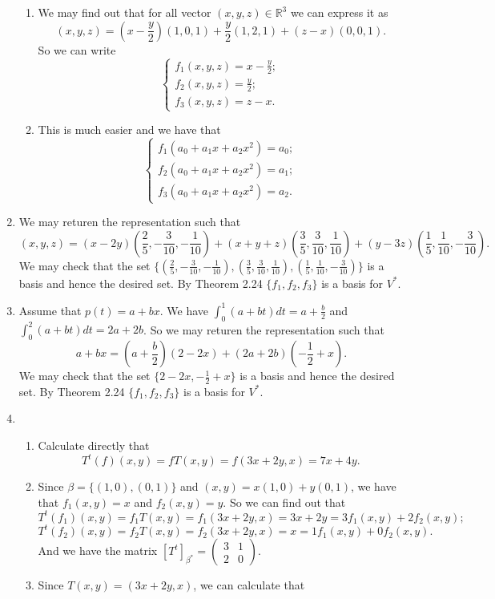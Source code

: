 \begin{enumerate}
\begin{enumerate}
\item We may find out that for all vector $(x,y,z)\in \mathbb{R}^3$ we can express it as 
\[(x,y,z)=(x-\frac{y}{2})(1,0,1)+\frac{y}{2}(1,2,1)+(z-x)(0,0,1).\]
So we can write 
\[\left\{\begin{array}{l}f_1(x,y,z)=x-\frac{y}{2};\\f_2(x,y,z)=\frac{y}{2};\\f_3(x,y,z)=z-x.\end{array}\right.\]
\item This is much easier and we have that 
\[\left\{\begin{array}{l}f_1(a_0+a_1x+a_2x^2)=a_0;\\f_2(a_0+a_1x+a_2x^2)=a_1;\\f_3(a_0+a_1x+a_2x^2)=a_2.\end{array}\right.\]
\end{enumerate}
\item We may returen the representation such that 
\[(x,y,z)=(x-2y)(\frac{2}{5},-\frac{3}{10},-\frac{1}{10})+(x+y+z)(\frac{3}{5},\frac{3}{10},\frac{1}{10})+(y-3z)(\frac{1}{5},\frac{1}{10},-\frac{3}{10}).\]
We may check that the set $\{(\frac{2}{5},-\frac{3}{10},-\frac{1}{10}),(\frac{3}{5},\frac{3}{10},\frac{1}{10}),(\frac{1}{5},\frac{1}{10},-\frac{3}{10})\}$ is a basis and hence the desired set. By Theorem 2.24 $\{f_1,f_2,f_3\}$ is a basis for $V^*$.
\item Assume that $p(t)=a+bx$. We have $\int_0^1{(a+bt)}dt=a+\frac{b}{2}$ and $\int_0^2{(a+bt)}dt=2a+2b$. So we may returen the representation such that 
\[a+bx=(a+\frac{b}{2})(2-2x)+(2a+2b)(-\frac{1}{2}+x).\]
We may check that the set $\{2-2x,-\frac{1}{2}+x\}$ is a basis and hence the desired set. By Theorem 2.24 $\{f_1,f_2,f_3\}$ is a basis for $V^*$.
\item \begin{enumerate}
\item Calculate directly that 
\[T^t(f)(x,y)=fT(x,y)=f(3x+2y,x)=7x+4y.\]
\item Since $\beta=\{(1,0),(0,1)\}$ and $(x,y)=x(1,0)+y(0,1)$, we have that $f_1(x,y)=x$ and $f_2(x,y)=y$. So we can find out that 
\[T^t(f_1)(x,y)=f_1T(x,y)=f_1(3x+2y,x)=3x+2y=3f_1(x,y)+2f_2(x,y);\]
\[T^t(f_2)(x,y)=f_2T(x,y)=f_2(3x+2y,x)=x=1f_1(x,y)+0f_2(x,y).\]
And we have the matrix $[T^t]_{\beta^*}=\left(\begin{array}{cc}3&1\\2&0\end{array}\right).$
\item Since $T(x,y)=(3x+2y,x)$, we can calculate that 

\end{enumerate}
\end{enumerate}
